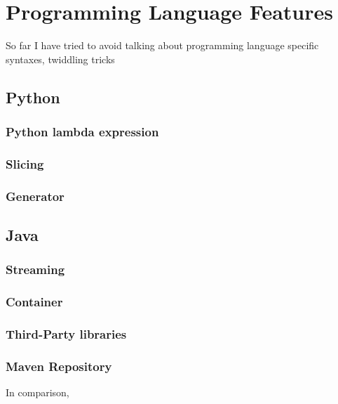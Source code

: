 \chapter{Programming Language Features}\label{ch:knowTheLanguageFeatures}

So far I have tried to avoid talking about programming language specific syntaxes, twiddling
tricks
\section{Python}\label{sec:python}
\subsection{Python lambda expression}\label{subsec:pythonLambdaExpression}
\subsection{Slicing}\label{subsec:slicing}
\subsection{Generator}\label{subsec:generator}




\section{Java}\label{sec:java}
\subsection{Streaming}\label{subsec:streaming}
\subsection{Container}\label{subsec:container}
\subsection{Third-Party libraries}\label{subsec:third-partyLibraries}
\subsection{Maven Repository}\label{subsec:mavenRepository}

In comparison, \java


